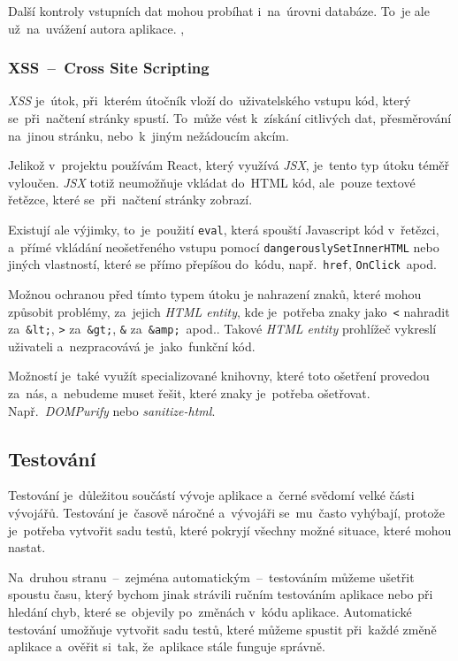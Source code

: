 \documentclass[10pt,a4paper]{article}
\begin{document}
            Další kontroly vstupních dat mohou probíhat i~na~úrovni databáze. To~je ale už~na~uvážení autora aplikace. \cite{w3s:SQLInjection}, \cite{itnetwork:SQLInjection}

            \subsubsection{XSS~--~Cross Site Scripting}
            \emph{XSS} je~útok, při~kterém útočník vloží do~uživatelského vstupu kód, který se~při~načtení stránky spustí. To~může vést k~získání citlivých dat, přesměrování na~jinou stránku, nebo~k~jiným nežádoucím akcím.

            Jelikož v~projektu používám React, který využívá \emph{JSX}, je~tento typ útoku téměř vyloučen. \emph{JSX} totiž neumožňuje vkládat do~HTML kód, ale~pouze textové řetězce, které se~při~načtení stránky zobrazí.

            Existují ale výjimky, to~je~použití \texttt{eval}, která spouští Javascript kód v~řetězci, a~přímé vkládání neošetřeného vstupu pomocí \texttt{dangerouslySetInnerHTML} nebo jiných vlastností, které se přímo přepíšou do~kódu, např.~\texttt{href}, \texttt{OnClick}~apod.

            Možnou ochranou před tímto typem útoku je nahrazení znaků, které mohou způsobit problémy, za~jejich \emph{HTML entity}, kde je~potřeba znaky jako~\texttt{<} nahradit za~\texttt{\&lt;}, \texttt{>} za~\texttt{\&gt;}, \texttt{\&} za~\texttt{\&amp;}~apod.. Takové \emph{HTML entity} prohlížeč vykreslí uživateli a~nezpracovává je~jako~funkční kód.
            
            Možností je~také využít specializované knihovny, které toto ošetření provedou za~nás, a~nebudeme muset řešit, které znaky je~potřeba ošetřovat. Např.~\emph{DOMPurify} nebo \emph{sanitize-html}. \cite{medium:XSS}

        \subsection{Testování}
        Testování je~důležitou součástí vývoje aplikace a~černé svědomí velké části vývojářů. Testování je~časově náročné a~vývojáři se~mu~často vyhýbají, protože je~potřeba vytvořit sadu testů, které pokryjí všechny možné situace, které mohou nastat.
        
        Na~druhou stranu~--~zejména automatickým~--~testováním můžeme ušetřit spoustu času, který bychom jinak strávili ručním testováním aplikace nebo při hledání chyb, které se~objevily po~změnách v~kódu aplikace. Automatické testování umožňuje vytvořit sadu testů, které můžeme spustit při~každé změně aplikace a~ověřit si~tak, že~aplikace stále funguje správně.
        
\end{document}
